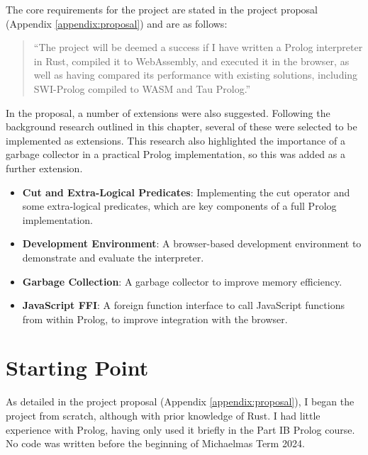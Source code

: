 \label{sec:requirements}

The core requirements for the project are stated in the project proposal (Appendix \ref{appendix:proposal}) and are as follows:

\begin{quote}
``The project will be deemed a success if I have written a Prolog interpreter in Rust, compiled it to WebAssembly, and executed it in the browser, as well as having compared its performance with existing solutions, including SWI-Prolog compiled to WASM and Tau Prolog.''
\end{quote}

In the proposal, a number of extensions were also suggested. Following the background research outlined in this chapter, several of these were selected to be implemented as extensions. This research also highlighted the importance of a garbage collector in a practical Prolog implementation, so this was added as a further extension.

\begin{itemize}
\item \textbf{Cut and Extra-Logical Predicates}: Implementing the cut operator and some extra-logical predicates, which are key components of a full Prolog implementation.
\item \textbf{Development Environment}: A browser-based development environment to demonstrate and evaluate the interpreter.
\item \textbf{Garbage Collection}: A garbage collector to improve memory efficiency.
\item \textbf{JavaScript FFI}: A foreign function interface to call JavaScript functions from within Prolog, to improve integration with the browser.
\end{itemize}

\section{Starting Point}

\label{sec:starting-point}

As detailed in the project proposal (Appendix \ref{appendix:proposal}), I began the project from scratch, although with prior knowledge of Rust. I had little experience with Prolog, having only used it briefly in the Part IB Prolog course. No code was written before the beginning of Michaelmas Term 2024.